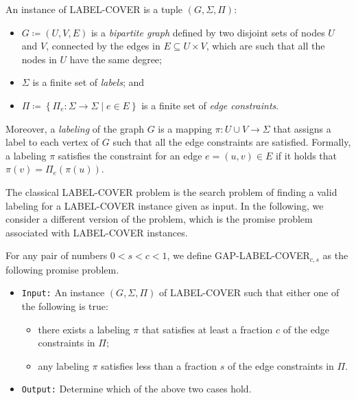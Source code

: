 \begin{definition}
	An instance of \textnormal{\textsf{LABEL-COVER}} is a tuple $( G, \Sigma, \Pi)$:
	\begin{itemize}
		\item $G \coloneqq (U,V,E)$ is a \emph{bipartite graph} defined by two disjoint sets of nodes $U$ and $V$, connected by the edges in $E \subseteq U \times V$, which are such that all the nodes in $U$ have the same degree;
		\item $\Sigma$ is a finite set of \emph{labels}; and
		\item $\Pi \coloneqq \left\{ \Pi_e : \Sigma \to \Sigma \mid e \in E \right\}$ is a finite set of \emph{edge constraints}.
	\end{itemize}
	Moreover, a \emph{labeling} of the graph $G$ is a mapping $\pi: U \cup V \to \Sigma$ that assigns a label to each vertex of $G$ such that all the edge constraints are satisfied.
	Formally, a labeling $\pi$ satisfies the constraint for an edge $e =(u,v) \in E$ if it holds that $ \pi(v) = \Pi_e(\pi(u))$.
\end{definition}

The classical \textsf{LABEL-COVER} problem is the search problem of finding a valid labeling for a \textsf{LABEL-COVER} instance given as input.
%
In the following, we consider a different version of the problem, which is the {promise problem} associated with \textsf{LABEL-COVER} instances.

\begin{definition}
	For any pair of numbers $0 < s < c < 1$, we define \textnormal{\textsf{GAP-LABEL-COVER}}$_{c,s}$ as the following promise problem.
	\begin{itemize}
		\item \textnormal{\texttt{Input:}} An instance $(G,\Sigma, \Pi)$ of \textnormal{\textsf{LABEL-COVER}} such that either one of the following is true:
		\begin{itemize}
			\item there exists a labeling $\pi$ that satisfies at least a fraction $c$ of the edge constraints in $\Pi$;
			\item any labeling $\pi$ satisfies less than a fraction $s$ of the edge constraints in $\Pi$.
		\end{itemize}
		\item \textnormal{\texttt{Output:}} Determine which of the above two cases hold.
	\end{itemize}
\end{definition}


